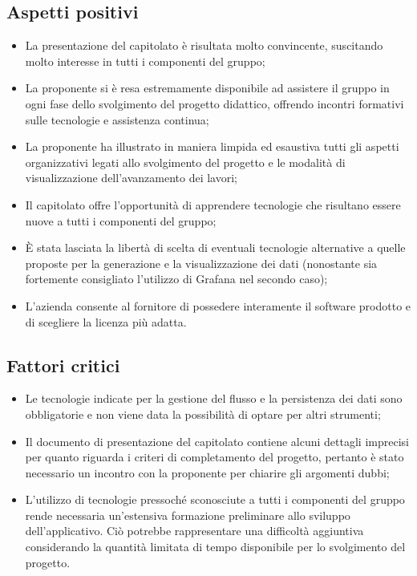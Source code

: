 \documentclass[8pt]{article}
\begin{document}
\subsection{Aspetti positivi}
\begin{itemize}
	\setlength\itemsep{0em}
	\item La presentazione del capitolato è risultata molto convincente, suscitando molto interesse in tutti i componenti del gruppo;
	\item La proponente si è resa estremamente disponibile ad assistere il gruppo in ogni fase dello svolgimento del progetto didattico, offrendo incontri formativi sulle tecnologie e assistenza continua;
	\item La proponente ha illustrato in maniera limpida ed esaustiva tutti gli aspetti organizzativi legati allo svolgimento del progetto e le modalità di visualizzazione dell'avanzamento dei lavori;
	\item Il capitolato offre l'opportunità di apprendere tecnologie che risultano essere nuove a tutti i componenti del gruppo;
	\item È stata lasciata la libertà di scelta di eventuali tecnologie alternative a quelle proposte per la generazione e la visualizzazione dei dati (nonostante sia fortemente consigliato l'utilizzo di Grafana nel secondo caso);
	\item L'azienda consente al fornitore di possedere interamente il software prodotto e di scegliere la licenza più adatta.
\end{itemize}

\subsection{Fattori critici}
\begin{itemize}
	\setlength\itemsep{0em}
	\item Le tecnologie indicate per la gestione del flusso e la persistenza dei dati sono obbligatorie e non viene data la possibilità di optare per altri strumenti;
	\item Il documento di presentazione del capitolato contiene alcuni dettagli imprecisi per quanto riguarda i criteri di completamento del progetto, pertanto è stato necessario un incontro con la proponente per chiarire gli argomenti dubbi;
	\item L'utilizzo di tecnologie pressoché sconosciute a tutti i componenti del gruppo rende necessaria un'estensiva formazione preliminare allo sviluppo dell'applicativo. Ciò potrebbe rappresentare una difficoltà aggiuntiva considerando la quantità limitata di tempo disponibile per lo svolgimento del progetto.
\end{itemize}
\end{document}
